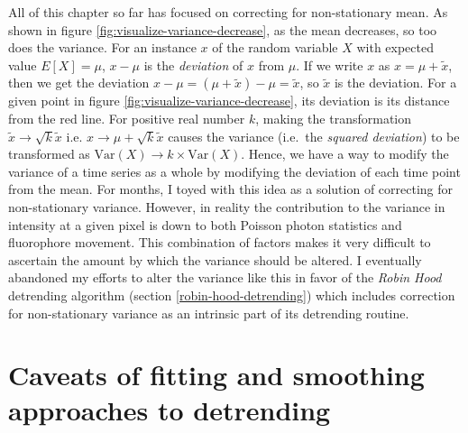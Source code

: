 \documentclass[12pt,]{book}
\theoremstyle{definition}
\theoremstyle{definition}
\theoremstyle{definition}
\theoremstyle{remark}
\begin{document}
All of this chapter so far has focused on correcting for non-stationary
mean. As shown in figure \ref{fig:visualize-variance-decrease}, as the
mean decreases, so too does the variance. For an instance \(x\) of the
random variable \(X\) with expected value \(E[X] = \mu\), \(x - \mu\) is
the \emph{deviation} of \(x\) from \(\mu\). If we write \(x\) as
\(x = \mu + \tilde{x}\), then we get the deviation
\(x - \mu = (\mu + \tilde{x}) - \mu = \tilde{x}\), so \(\tilde{x}\) is
the deviation. For a given point in figure
\ref{fig:visualize-variance-decrease}, its deviation is its distance
from the red line. For positive real number \(k\), making the
transformation \(\tilde{x} \rightarrow \sqrt{k}\tilde{x}\) i.e.
\(x \rightarrow \mu + \sqrt{k}\tilde{x}\) causes the variance (i.e.~the
\emph{squared deviation}) to be transformed as
\(\text{Var}(X) \rightarrow k \times \text{Var}(X)\). Hence, we have a
way to modify the variance of a time series as a whole by modifying the
deviation of each time point from the mean. For months, I toyed with
this idea as a solution of correcting for non-stationary variance.
However, in reality the contribution to the variance in intensity at a
given pixel is down to both Poisson photon statistics and fluorophore
movement. This combination of factors makes it very difficult to
ascertain the amount by which the variance should be altered. I
eventually abandoned my efforts to alter the variance like this in favor
of the \emph{Robin Hood} detrending algorithm (section
\ref{robin-hood-detrending}) which includes correction for
non-stationary variance as an intrinsic part of its detrending routine.

\section{Caveats of fitting and smoothing approaches to
detrending}\label{caveats-of-fitting-and-smoothing-approaches-to-detrending}
\end{document}
